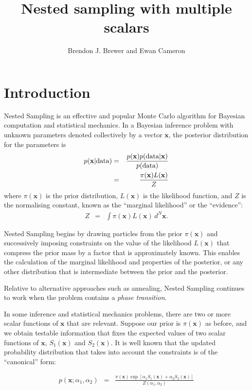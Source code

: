 \documentclass[a4paper, 11pt]{article}
\title{Nested sampling with multiple scalars}
\author{Brendon J. Brewer and Ewan Cameron}
\newcommand{\xx}{\mathbf{x}}	%
\newcommand{\dx}{d^N\mathbf{x}} %
\begin{document}
\maketitle


\section{Introduction}
Nested Sampling \citep{skilling} is an effective and popular
Monte Carlo algorithm for Bayesian computation and statistical mechanics.
In a Bayesian inference problem with unknown parameters denoted collectively
by a vector $\mathbf{x}$, the
posterior distribution for the parameters is
\begin{eqnarray}
p(\mathbf{x} | {\rm data}) &=&
\frac{p(\mathbf{x})p({\rm data} | \mathbf{x})}{p(\rm data)}\\
&=& \frac{\pi(\xx)L(\xx)}{Z}
\end{eqnarray}
where $\pi(\xx)$ is the prior distribution, $L(\xx)$ is the likelihood
function, and $Z$ is the normalising constant, known as the
``marginal likelihood'' or the ``evidence'':
\begin{eqnarray}
Z &=& \int \pi(\xx) L(\xx) \, \dx.
\end{eqnarray}

Nested Sampling begins by drawing particles from the
prior $\pi(\xx)$ and successively imposing constraints on the value of
the likelihood $L(\xx)$ that compress the prior mass by a
factor that is approximately known.
This enables the calculation of the marginal likelihood
and properties of the posterior, or any other distribution that is intermediate
between the prior and the posterior.

Relative to alternative approaches such as annealing, Nested Sampling continues
to work when the problem contains a {\it phase transition}.

In some inference and
statistical mechanics problems, there are two or more scalar functions of
$\xx$ that are relevant. Suppose our prior is $\pi(\xx)$ as before, and
we obtain testable information that fixes the expected values of two scalar
functions of $\xx$, $S_1(\xx)$ and $S_2(\xx)$. It is well known that the
updated probability distribution that takes into account the constraints is
of the ``canonical'' form:

\begin{eqnarray}
p(\xx; \alpha_1, \alpha_2) &=& \frac{\pi(\xx)\exp\left[\alpha_1S_1(\xx)+\alpha_2S_2(\xx)\right]}
{Z(\alpha_1, \alpha_2)}
\end{eqnarray}
\end{document}

